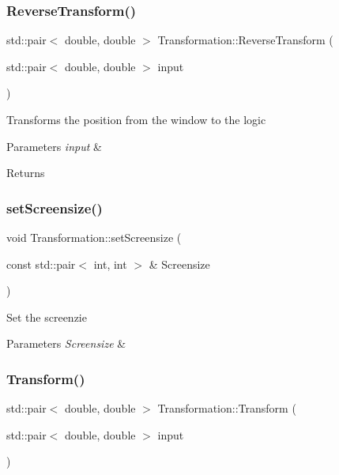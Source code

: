 \subsubsection{\texorpdfstring{Reverse\+Transform()}{ReverseTransform()}}
{\footnotesize\ttfamily std\+::pair$<$ double, double $>$ Transformation\+::\+Reverse\+Transform (\begin{DoxyParamCaption}\item[{std\+::pair$<$ double, double $>$}]{input }\end{DoxyParamCaption})}

Transforms the position from the window to the logic 
\begin{DoxyParams}{Parameters}
{\em input} & \\
\hline
\end{DoxyParams}
\begin{DoxyReturn}{Returns}

\end{DoxyReturn}
\mbox{\label{classTransformation_a68bd35342726f9920e45cb881457c609}} 
\subsubsection{\texorpdfstring{set\+Screensize()}{setScreensize()}}
{\footnotesize\ttfamily void Transformation\+::set\+Screensize (\begin{DoxyParamCaption}\item[{const std\+::pair$<$ int, int $>$ \&}]{Screensize }\end{DoxyParamCaption})}

Set the screenzie 
\begin{DoxyParams}{Parameters}
{\em Screensize} & \\
\hline
\end{DoxyParams}
\mbox{\label{classTransformation_a1f4a47d5dd9aaee579613788b7a567bc}} 
\subsubsection{\texorpdfstring{Transform()}{Transform()}}
{\footnotesize\ttfamily std\+::pair$<$ double, double $>$ Transformation\+::\+Transform (\begin{DoxyParamCaption}\item[{std\+::pair$<$ double, double $>$}]{input }\end{DoxyParamCaption})}

